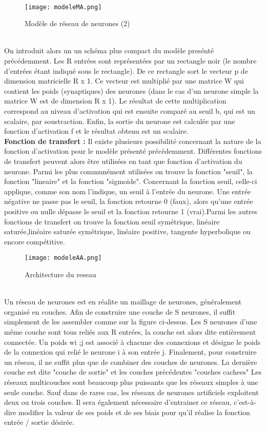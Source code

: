 \documentclass{article}
\begin{document}
\\
    \begin{figure}[hp]
	    \centering
	    \texttt{[image: modeleMA.png]}
	    \caption{Modèle de réseau de neurones (2) }
    \end{figure}
\\
On introduit alors un un schéma plus compact du modèle presénté précédemment. Les R entrées sont représentées par un rectangle noir (le nombre d’entrées étant indiqué sous le rectangle). De ce rectangle sort le vecteur p de dimension matricielle R x 1. Ce vecteur est multiplié par une matrice W qui contient les poids (synaptiques) des neurones (dans le cas d’un neurone simple la matrice W est de dimension R x 1). Le résultat de cette multiplication correspond au niveau d’activation qui est ensuite comparé au seuil b, qui est un scalaire, par soustraction. Enfin, la sortie du neurone est calculée par une fonction d’activation f et le résultat obtenu est un scalaire.\\

\textbf{Fonction de transfert :}
Il existe plusieurs possibilité concernant la nature de la fonction d’activation pour le modèle présenté précédemment. Différentes fonctions de transfert peuvent alors être utilisées en tant que fonction d’activation du neurone. Parmi les plus communément utilisées on trouve la fonction "seuil", la fonction "lineaire" et la fonction "sigmoide". Concernant la fonction seuil, celle-ci applique, comme son nom l’indique, un seuil à l’entrée du neurone. Une entrée négative ne passe pas le seuil, la fonction retourne 0 (faux), alors qu’une entrée positive ou nulle dépasse le seuil et la fonction retourne 1 (vrai).Parmi les autres fonctions de transfert on trouve la fonction seuil symétrique, linéaire saturée,linéaire saturée symétrique, linéaire positive, tangente hyperbolique ou encore compétitive.
\newpage
    \begin{figure}[hp]
	    \centering
	    \texttt{[image: modeleAA.png]}
	    \caption{Architecture du reseau}
    \end{figure}

\\
Un réseau de neurones est en réalite un maillage de neurones, généralement organisé en couches. Afin de construire une couche de S neurones, il suffit simplement de les assembler comme sur la figure ci-dessus. Les S neurones d’une même couche sont tous reliés aux R entrées, la couche est alors dite entièrement connectée. Un poids wi ;j est associé à chacune des connexions et désigne le poids de la connexion qui relié le neurone i à son entrée j. Finalement, pour construire un réseau, il ne suffit plus que de combiner des couches de neurones. La dernière couche est dite "couche de sortie" et les couches précédentes "couches cachees" Les réseaux multicouches sont beaucoup plus puissants que les réseaux simples à une seule couche. Sauf dans de rares cas, les réseaux de neurones artificiels exploitent deux ou trois couches. Il sera également nécessaire d’entrainer ce réseau, c’est-à-dire modifier la valeur de ses poids et de ses biais pour qu’il réalise la fonction entrée / sortie désirée.
\newpage
\end{document}
